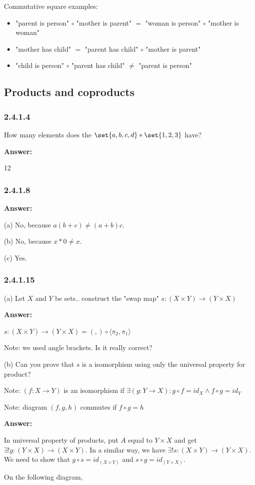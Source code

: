 \documentclass{article}
\newcommand{\vsp}[0]{\vspace*{10pt}\par}
\newcommand{\exercise}[1]{\subsubsection*{#1}}
\newcommand{\ans}[0]{\vsp\textbf{Answer: }\vsp}
\begin{document}
Commutative square examples:
\begin{itemize}
\item "parent is person" $\circ$ "mother is parent" $=$ "woman is person" $\circ$ "mother is woman"
\item "mother has child" $=$ "parent has child" $\circ$ "mother is parent"
\item "child is person" $\circ$ "parent has child" $\ne$ "parent is person"
\end{itemize}

\setcounter{subsection}{3}
\subsection{Products and coproducts}

\exercise{2.4.1.4}
How many elements does the $\set{a,b,c,d} * \set{1,2,3}$ have?
\ans
12

\exercise{2.4.1.8}
\ans
(a) No, because $a(b + c) \neq (a+b)c$.
\vsp
(b) No, because $x*0 \neq x$.
\vsp
(c) Yes.

\exercise{2.4.1.15}

(a) Let $X$ and $Y$ be sets.. construct the "swap map" $s:(X \times Y)\to(Y \times X)$
\ans
$s:(X \times Y)\to(Y \times X) = (,)\circ\langle\pi_2,\pi_1\rangle$

Note: we used angle brackets. Is it really correct?

\vsp
(b) Can you prove that $s$ is a isomorphism using only the universal property for product?

Note: $(f:X \to Y)$ is an isomorphism if $\exists (g:Y \to X): g \circ f = id_X \land f \circ g =
id_Y$

Note: diagram $(f,g,h)$ commutes if $f \circ g = h$
\ans

In universal property of products, put $A$ equal to $Y \times X$ and get $\exists !
g:(Y \times X)\to(X \times Y)$. In a similar way, we have $\exists! s:(X \times Y)\to(Y \times X)$.
We need to show that $g \circ s = id_{(X \times Y)}$ and $s \circ g = id_{(Y\times X)}$.

On the following diagram,

\end{document}
